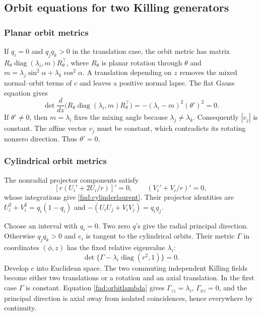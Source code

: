 \documentclass[11pt,a4paper]{article}
\numberwithin{equation}{section}
\theoremstyle{plain}
\theoremstyle{definition}
\theoremstyle{remark}
\begin{document}
\subsection{Orbit equations for two Killing generators}\label{appn:two-killing-proof}

\subsubsection{Planar orbit metrics}
If $q_i=0$ and $q_jq_k>0$ in the translation case, the orbit metric
has matrix $R_\theta\operatorname{diag}(\lambda_i,m)R_\theta^{\top}$,
where $R_\theta$ is planar rotation through $\theta$ and
$m=\lambda_j\sin^2\alpha+\lambda_k\cos^2\alpha$.
A translation depending on $z$ removes the mixed normal--orbit
terms of $c$ and leaves a positive normal lapse. The flat Gauss
equation gives
\[
\det\frac{d}{dz}\bigl(R_\theta\operatorname{diag}(\lambda_i,m)R_\theta^{\top}\bigr)
=-(\lambda_i-m)^2(\theta')^2=0.
\]
If $\theta'\ne0$, then $m=\lambda_i$ fixes the mixing angle
because $\lambda_j\ne\lambda_k$. Consequently $|v_j|$ is constant.
The affine vector $v_j$ must be constant, which contradicts its
rotating nonzero direction. Thus $\theta'=0$.

\subsubsection{Cylindrical orbit metrics}
The nonradial projector components satisfy
\[
[r(U_i'+2U_i/r)]'=0,\qquad (V_i'+V_i/r)'=0,
\]
whose integrations give \eqref{fnd:cylinderlaurent}.
Their projector identities are
$U_i^2+V_i^2=q_i(1-q_i)$ and
$-(U_iU_j+V_iV_j)=q_iq_j$.

Choose an interval with $q_i=0$. Two zero $q$'s give the radial principal direction. Otherwise $q_jq_k>0$ and $e_i$ is tangent to the cylindrical orbits. Their metric $\Gamma$ in coordinates $(\phi,z)$ has the fixed relative eigenvalue $\lambda_i$:
\begin{equation}\label{fnd:orbitlambda}
\det\{\Gamma-\lambda_i\operatorname{diag}(r^2,1)\}=0.
\end{equation}
Develop $c$ into Euclidean space. The two commuting independent Killing fields become either two translations or a rotation and an axial translation. In the first case $\Gamma$ is constant. Equation \eqref{fnd:orbitlambda} gives $\Gamma_{zz}=\lambda_i$, $\Gamma_{\phi z}=0$, and the principal direction is axial away from isolated coincidences, hence everywhere by continuity.
\end{document}
